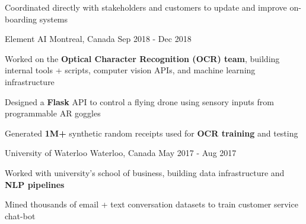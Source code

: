 \documentclass[11pt, a4paper]{awesome-cv}
\begin{document}
\begin{siderules1}
\begin{cventries}
{\begin{cvitems}
        \item {Coordinated directly with stakeholders and customers to update and improve on-boarding systems}
      \end{cvitems}
    }
    \cventry
    {\textit{}}
    {Element AI}
    {Montreal, Canada}
    {Sep 2018 - Dec 2018}
    {
      \begin{cvitems}
        \item {Worked on the \textbf{Optical Character Recognition (OCR) team}, building internal tools + scripts, computer vision APIs, and machine learning infrastructure}
        \item {Designed a \textbf{Flask} API to control a flying drone using sensory inputs from programmable AR goggles}
        \item {Generated \textbf{1M+} synthetic random receipts used for \textbf{OCR training} and testing}
      \end{cvitems}
    }
  \cventry
    {\textit{}}
    {University of Waterloo}
    {Waterloo, Canada}
    {May 2017 - Aug 2017}
    {
      \begin{cvitems}
        \item {Worked with university's school of business, building data infrastructure and \textbf{NLP pipelines}}
        \item {Mined thousands of email + text conversation datasets to train customer service chat-bot}
      \end{cvitems}
    }
\end{cventries}
\end{siderules1}
\end{document}
